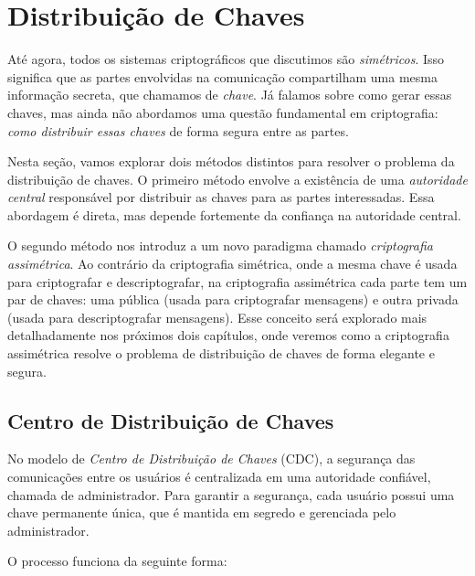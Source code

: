 \chapter{Distribuição de Chaves}
\label{cha:distribuicao-chaves}

Até agora, todos os sistemas criptográficos que discutimos são {\em simétricos}.
Isso significa que as partes envolvidas na comunicação compartilham uma mesma informação secreta, que chamamos de {\em chave}.
Já falamos sobre como gerar essas chaves, mas ainda não abordamos uma questão fundamental em criptografia:
{\em como distribuir essas chaves} de forma segura entre as partes.

Nesta seção, vamos explorar dois métodos distintos para resolver o problema da distribuição de chaves.
O primeiro método envolve a existência de uma {\em autoridade central} responsável por distribuir as chaves para as partes interessadas.
Essa abordagem é direta, mas depende fortemente da confiança na autoridade central.

O segundo método nos introduz a um novo paradigma chamado {\em criptografia assimétrica}.
Ao contrário da criptografia simétrica, onde a mesma chave é usada para criptografar e descriptografar, na criptografia assimétrica cada parte tem um par de chaves:
uma pública (usada para criptografar mensagens) e outra privada (usada para descriptografar mensagens).
Esse conceito será explorado mais detalhadamente nos próximos dois capítulos, onde veremos como a criptografia assimétrica resolve o problema de distribuição de chaves de forma elegante e segura.

\section{Centro de Distribuição de Chaves}
\label{sec:kdc}

No modelo de {\em Centro de Distribuição de Chaves} (CDC), a segurança das comunicações entre os usuários é centralizada em uma autoridade confiável, chamada de administrador.
Para garantir a segurança, cada usuário possui uma chave permanente única, que é mantida em segredo e gerenciada pelo administrador.

O processo funciona da seguinte forma:

